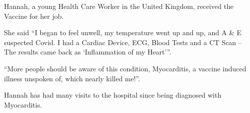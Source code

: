 Hannah, a young Health Care Worker in the United Kingdom, received the Vaccine
for her job.

She said “I began to feel unwell, my temperature went up and up, and A \& E
suspected Covid. I had a Cardiac Device, ECG, Blood Tests and a CT Scan – The
results came back as ‘Inflammation of my Heart'”.

“More people should be aware of this condition, Myocarditis, a vaccine induced
illness unspoken of, which nearly killed me!”.

Hannah has had many visits to the hospital since being diagnosed with
Myocarditis.

